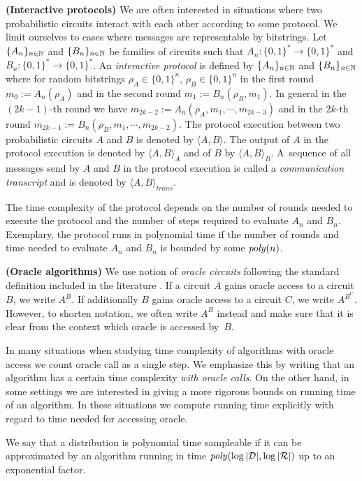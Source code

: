 \textbf{(Interactive protocols)}
We are often interested in situations where two probabilistic circuits interact with each other according to some protocol.
We limit ourselves to cases where messages are representable by bitstrings.
Let $\{A_n\}_{n \in \mathbb{N}}$ and $\{B_n\}_{n \in \mathbb{N}}$ be families of circuits such that $A_n : \{0,1\}^{*} \rightarrow \{0,1\}^{*}$ and $B_n : \{0,1\}^{*} \rightarrow \{0,1\}^{*}$.
An \textit{interactive protocol} is defined by $\{A_n\}_{n \in \mathbb{N}}$ and $\{B_n\}_{n \in \mathbb{N}}$ where
for random bitstrings $\rho_A \in \{0,1\}^{n}$, $\rho_B \in \{0,1\}^{n}$ in the first round $m_0 := A_n(\rho_A)$ and in the second round $m_1 := B_n(\rho_B, m_1)$.
In general in the $(2k\!-\!1)$-th round we have $m_{2k-2} := A_n(\rho_A, m_1, \cdots, m_{2k-3})$ and in the $2k$-th round $m_{2k-1} := B_n(\rho_B, m_1, \cdots, m_{2k-2})$.
The protocol execution between two probabilistic circuits $A$ and $B$ is denoted by $\langle A, B \rangle$.
The output of $A$ in the protocol execution is denoted by $\langle A, B \rangle_A$ and of $B$ by $\langle A, B \rangle_B$.
A~sequence of all messages send by $A$ and $B$ in the protocol execution is called a \textit{communication transcript} and
is denoted by $\langle A, B \rangle_{\mathit{trans}}$.

The time complexity of the protocol depends on the number of rounds needed to execute the protocol
and the number of steps required to evaluate $A_n$ and $B_n$.
Exemplary, the protocol runs in polynomial time if the number of rounds and time needed to evaluate $A_n$ and $B_n$ is bounded by some $\operatorname{\mathit{poly}}(n)$.

\textbf{(Oracle algorithms)}
We use notion of \textit{oracle circuits} following the standard definition included in the literature \cite{Goldreich:2004:FCV:975541}.
If a circuit $A$ gains oracle access to a circuit $B$, we write $A^{B}$. If additionally $B$ gains oracle access to a circuit $C$,
we write $A^{B^C}$. However, to shorten notation, we often write $A^{B}$ instead and make sure that it is clear from the context which oracle is accessed by~$B$.

In many situations when studying time complexity of algorithms with oracle access we count oracle call as a single step.
We emphasize this by writing that an algorithm has a certain time complexity \textit{with oracle calls}.
On the other hand, in some settings we are interested in giving a more rigorous bounds on running time of an algorithm.
In these situations we compute running time explicitly with regard to time needed for accessing oracle.
\begin{definition}
We say that a distribution is \textnormal{polynomial time sampleable} if it can be approximated by an algorithm running in time $\mathit{poly}(\log|\mathcal{D}|, \log|\mathcal{R}|)$
up to an exponential factor.
\end{definition}


